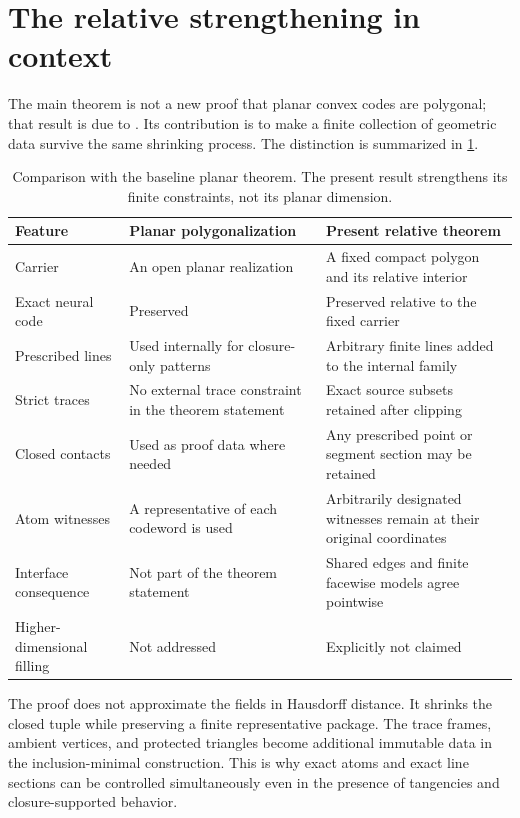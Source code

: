 \section{The relative strengthening in context}\label{sec:comparison}

The main theorem is not a new proof that planar convex codes are polygonal;
that result is due to \citet{BukhJeffs2023}.  Its contribution is to make a
finite collection of geometric data survive the same shrinking process.
The distinction is summarized in \cref{tab:comparison}.

\begin{table}[h]
\centering
\small
\begin{tabular}{@{}p{}p{}p{}@{}}
\toprule
Feature & Planar polygonalization & Present relative theorem\\
\midrule
Carrier & An open planar realization & A fixed compact polygon and its relative interior\\
Exact neural code & Preserved & Preserved relative to the fixed carrier\\
Prescribed lines & Used internally for closure-only patterns & Arbitrary finite lines added to the internal family\\
Strict traces & No external trace constraint in the theorem statement & Exact source subsets retained after clipping\\
Closed contacts & Used as proof data where needed & Any prescribed point or segment section may be retained\\
Atom witnesses & A representative of each codeword is used & Arbitrarily designated witnesses remain at their original coordinates\\
Interface consequence & Not part of the theorem statement & Shared edges and finite facewise models agree pointwise\\
Higher-dimensional filling & Not addressed & Explicitly not claimed\\
\bottomrule
\end{tabular}
\caption{Comparison with the baseline planar theorem.  The present result
strengthens its finite constraints, not its planar dimension.}
\label{tab:comparison}
\end{table}

The proof does not approximate the fields in Hausdorff distance.  It shrinks
the closed tuple while preserving a finite representative package.  The
trace frames, ambient vertices, and protected triangles become additional
immutable data in the inclusion-minimal construction.  This is why exact
atoms and exact line sections can be controlled simultaneously even in the
presence of tangencies and closure-supported behavior.
